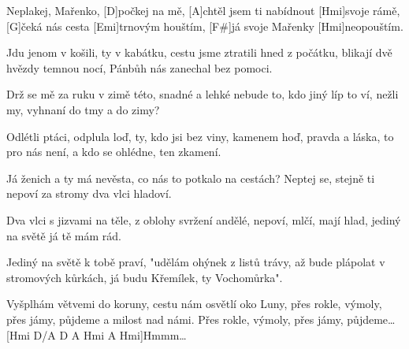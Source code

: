 
\sloka
[Hmi]Neplakej, Mařenko, [D]počkej na mě,
[A]chtěl jsem ti nabídnout [Hmi]svoje rámě,
[G]čeká nás cesta [Emi]trnovým houštím,
[F#]já svoje Mařenky [Hmi]neopouštím.

\sloka
Jdu jenom v košili, ty v kabátku, cestu jsme ztratili hned z počátku,
blikají dvě hvězdy temnou nocí, Pánbůh nás zanechal bez pomoci.

\sloka
Drž se mě za ruku v zimě této, snadné a lehké nebude to,
kdo jiný líp to ví, nežli my, vyhnaní do tmy a do zimy?

\sloka
Odlétli ptáci, odplula loď, ty, kdo jsi bez viny, kamenem hoď,
pravda a láska, to pro nás není, a kdo se ohlédne, ten zkamení.

\sloka
Já ženich a ty má nevěsta, co nás to potkalo na cestách?
Neptej se, stejně ti nepoví za stromy dva vlci hladoví.

\sloka
Dva vlci s jizvami na těle, z oblohy svržení andělé,
nepoví, mlčí, mají hlad, jediný na světě já tě mám rád.

\sloka
Jediný na světě k tobě praví, "udělám ohýnek z listů trávy,
až bude plápolat v stromových kůrkách, já budu Křemílek,
\qquad ty Vochomůrka".

\sloka
Vyšplhám větvemi do koruny, cestu nám osvětlí oko Luny,
přes rokle, výmoly, přes jámy, půjdeme a milost nad námi.
Přes rokle, výmoly, přes jámy, půjdeme…
[Hmi D/A D A Hmi A Hmi]Hmmm…
